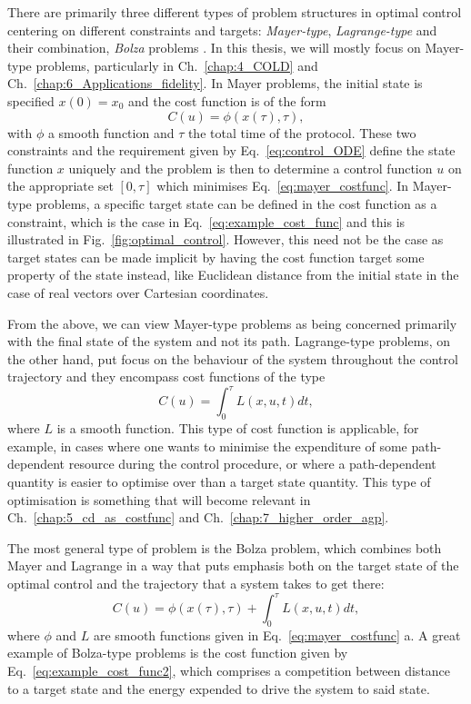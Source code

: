 There are primarily three different types of problem structures in optimal control centering on different constraints and targets: \emph{Mayer-type}, \emph{Lagrange-type} and their combination, \emph{Bolza} problems \cite{dalessandro_introduction_2021}. In this thesis, we will mostly focus on Mayer-type problems, particularly in Ch.~\ref{chap:4_COLD} and Ch.~\ref{chap:6_Applications_fidelity}. In Mayer problems, the initial state is specified $x(0) = x_0$ and the cost function is of the form
\begin{equation}\label{eq:mayer_costfunc}
    C(u) = \phi(x(\tau), \tau),
\end{equation}
with $\phi$ a smooth function and $\tau$ the total time of the protocol. These two constraints and the requirement given by Eq.~\eqref{eq:control_ODE} define the state function $x$ uniquely and the problem is then to determine a control function $u$ on the appropriate set $[0, \tau]$ which minimises Eq.~\eqref{eq:mayer_costfunc}. In Mayer-type problems, a specific target state can be defined in the cost function as a constraint, which is the case in Eq.~\eqref{eq:example_cost_func} and this is illustrated in Fig.~\ref{fig:optimal_control}. However, this need not be the case as target states can be made implicit by having the cost function target some property of the state instead, like Euclidean distance from the initial state in the case of real vectors over Cartesian coordinates. 

From the above, we can view Mayer-type problems as being concerned primarily with the final state of the system and not its path. Lagrange-type problems, on the other hand, put focus on the behaviour of the system throughout the control trajectory and they encompass cost functions of the type
\begin{equation}\label{eq:lagrange_type_costfunc}
    C(u) = \int_0^{\tau} L(x, u, t) dt,
\end{equation}
where $L$ is a smooth function. This type of cost function is applicable, for example, in cases where one wants to minimise the expenditure of some path-dependent resource during the control procedure, or where a path-dependent quantity is easier to optimise over than a target state quantity. This type of optimisation is something that will become relevant in Ch.~\ref{chap:5_cd_as_costfunc} and Ch.~\ref{chap:7_higher_order_agp}. 

The most general type of problem is the Bolza problem, which combines both Mayer and Lagrange in a way that puts emphasis both on the target state of the optimal control and the trajectory that a system takes to get there:
\begin{equation}\label{eq:bolza_tyoe_costfunc}
    C(u) = \phi(x(\tau), \tau) + \int_0^{\tau} L(x, u, t) dt,
\end{equation}
where $\phi$ and $L$ are smooth functions given in Eq.~\eqref{eq:mayer_costfunc} a. A great example of Bolza-type problems is the cost function given by Eq.~\eqref{eq:example_cost_func2}, which comprises a competition between distance to a target state and the energy expended to drive the system to said state. 

